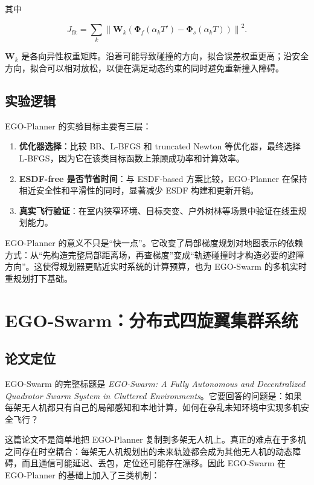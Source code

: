 \documentclass[UTF8,a4paper,12pt]{ctexart}
\newcommand{\traj}{\boldsymbol{\Phi}}
\begin{document}
其中

\begin{equation}
  J_{\mathrm{fit}}=\sum_k
  \left\|
  \mathbf{W}_k \left(\traj_f(\alpha_k T')-\traj_s(\alpha_k T)\right)
  \right\|^2 .
\end{equation}

$\mathbf{W}_k$ 是各向异性权重矩阵。沿着可能导致碰撞的方向，拟合误差权重更高；沿安全方向，拟合可以相对放松，以便在满足动态约束的同时避免重新撞入障碍。

\subsection{实验逻辑}

EGO-Planner 的实验目标主要有三层：

\begin{enumerate}
  \item \textbf{优化器选择}：比较 BB、L-BFGS 和 truncated Newton 等优化器，最终选择 L-BFGS，因为它在该类目标函数上兼顾成功率和计算效率。
  \item \textbf{ESDF-free 是否节省时间}：与 ESDF-based 方案比较，EGO-Planner 在保持相近安全性和平滑性的同时，显著减少 ESDF 构建和更新开销。
  \item \textbf{真实飞行验证}：在室内狭窄环境、目标突变、户外树林等场景中验证在线重规划能力。
\end{enumerate}

EGO-Planner 的意义不只是“快一点”。它改变了局部梯度规划对地图表示的依赖方式：从“先构造完整局部距离场，再查梯度”变成“轨迹碰撞时才构造必要的避障方向”。这使得规划器更贴近实时系统的计算预算，也为 EGO-Swarm 的多机实时重规划打下基础。

\section{EGO-Swarm：分布式四旋翼集群系统}

\subsection{论文定位}

EGO-Swarm 的完整标题是 \textit{EGO-Swarm: A Fully Autonomous and Decentralized Quadrotor Swarm System in Cluttered Environments}。它要回答的问题是：如果每架无人机都只有自己的局部感知和本地计算，如何在杂乱未知环境中实现多机安全飞行？

这篇论文不是简单地把 EGO-Planner 复制到多架无人机上。真正的难点在于多机之间存在时空耦合：每架无人机规划出的未来轨迹都会成为其他无人机的动态障碍，而且通信可能延迟、丢包，定位还可能存在漂移。因此 EGO-Swarm 在 EGO-Planner 的基础上加入了三类机制：
\end{document}
